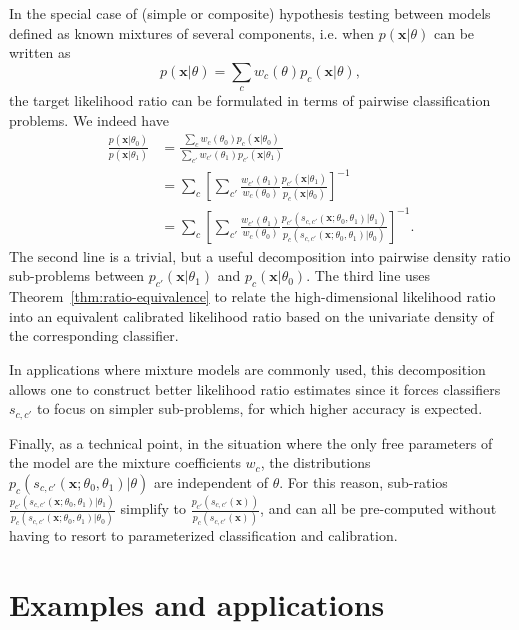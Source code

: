 \documentclass[12pt]{article}
\numberwithin{equation}{section}
\theoremstyle{plain}
\begin{document}
In the special case of (simple or composite) hypothesis testing between
models defined as known mixtures of several components, i.e. when $p(\mathbf{x}|\theta)$ can be written as
\begin{equation}
p(\mathbf{x}|\theta)=\sum_c w_c(\theta) p_c(\mathbf{x}| \theta),
\end{equation}
the target likelihood ratio can be formulated in terms of pairwise
classification problems. We indeed have
\begin{align}
\frac{p(\mathbf{x}|\theta_0)}{p(\mathbf{x}|\theta_1)} &= \frac{\sum_c w_c(\theta_0) p_c(\mathbf{x}| \theta_0)}{\sum_{c'} w_{c'}(\theta_1) p_{c'}(\mathbf{x}| \theta_1)} \nonumber \\
&= \sum_c \left[ \sum_{c'} \frac{ w_{c'}(\theta_1)}{w_c(\theta_0)} \frac{ p_{c'}(\mathbf{x}| \theta_1)}{  p_c(\mathbf{x}| \theta_0)}  \right]^{-1} \nonumber \\
&= \sum_c \left[ \sum_{c'} \frac{ w_{c'}(\theta_1)}{w_c(\theta_0)} \frac{ p_{c'}(s_{c,c'}(\mathbf{x};\theta_0, \theta_1)| \theta_1)}{ p_c(s_{c,c'}(\mathbf{x};\theta_0, \theta_1)| \theta_0)}  \right]^{-1}. \label{eq:decomposedResult}
\end{align}
The second line is a trivial, but a useful decomposition into pairwise
density ratio sub-problems between $p_{c'}(\mathbf{x}|\theta_1)$ and
$p_c(\mathbf{x}|\theta_0)$.  The third line uses
Theorem~\ref{thm:ratio-equivalence} to relate the high-dimensional likelihood
ratio into an equivalent calibrated likelihood ratio based on the univariate
density of the corresponding classifier.

In applications where mixture models are commonly used, this decomposition allows
one to construct better likelihood ratio estimates since it forces classifiers
$s_{c,c'}$ to focus on simpler sub-problems, for which higher accuracy is
expected.

Finally, as a technical point, in the situation where the only free parameters
of the  model are the mixture coefficients $w_c$, the distributions
$p_{c}(s_{c,c'}(\mathbf{x};\theta_0, \theta_1)| \theta)$ are independent of
$\theta$. For this reason, sub-ratios $\frac{
p_{c'}(s_{c,c'}(\mathbf{x};\theta_0, \theta_1)|\theta_1)}{
p_c(s_{c,c'}(\mathbf{x};\theta_0, \theta_1)|\theta_0)}$ simplify to $\frac{
p_{c'}(s_{c,c'}(\mathbf{x}))}{ p_c(s_{c,c'}(\mathbf{x}))}$, and can all be
pre-computed without having to resort to parameterized classification and
calibration.



\section{Examples and applications}
\label{sec:examples}
\end{document}
